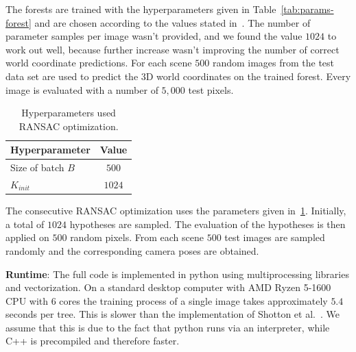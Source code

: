 \documentclass[final]{cvpr}
\begin{document}
The forests are trained with the hyperparameters given in Table~\ref{tab:params-forest} and are chosen according to the 
values stated in~\cite{shotton2013}. The number of parameter samples per image wasn't provided, and we found the
value $1024$ to work out well, because further increase wasn't improving the number of correct world coordinate predictions.
For each scene $500$ random images from the test data set are used
to predict the 3D world coordinates on the trained forest. Every image is evaluated with a number of $5,000$ test pixels.

\begin{table}[h!]
	\begin{center}
	\begin{tabular}{|l|c|}
	\hline
	Hyperparameter & Value \\
	\hline\hline
	Size of batch $B$ & $500$ \\
	$K_{init}$ & $1024$ \\
	
	\hline
	\end{tabular}
	\end{center}
	\caption{Hyperparameters used RANSAC optimization.}
	\label{tab:params-ransac}
\end{table}

The consecutive RANSAC optimization uses the parameters given in~\ref{tab:params-ransac}. Initially, a total of $1024$
hypotheses are sampled. The evaluation of the hypotheses is then applied on $500$ random pixels. From each scene $500$
test images are sampled randomly and the corresponding camera poses are obtained.

\textbf{Runtime}: The full code is implemented in python using multiprocessing libraries and vectorization. On a standard
desktop computer with AMD Ryzen 5-1600 CPU with 6 cores the training process of a single image
takes approximately $5.4$ seconds per tree. This is slower than the implementation of Shotton et al.~\cite{shotton2013}.
We assume that this is due to the fact that python runs via an interpreter, while C++ is precompiled and therefore faster.
\end{document}
